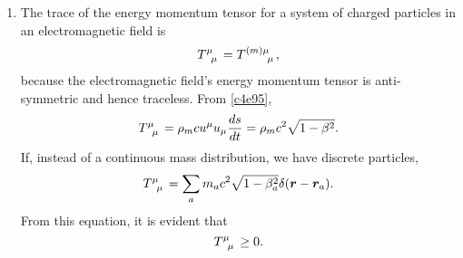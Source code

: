\begin{enumerate}
\item The trace of the energy momentum tensor for a system of charged particles
in an electromagnetic field is
\begin{equation}\label{c4e106}
\tensor{T}{^\mu_\mu} = \tensor{T}{^{(m)\mu}_\mu},
\end{equation}
because the electromagnetic field's energy momentum tensor is anti-symmetric and
hence traceless. From \eqref{c4e95},
\begin{equation}\label{c4e107}
\tensor{T}{^\mu_\mu} = \rho_m cu^\mu u_\mu \td{s}{t} = \rho_m c^2\sqrt{1 - \beta^2}.
\end{equation}
If, instead of a continuous mass distribution, we have discrete particles,
\begin{equation}\label{c4e108}
\tensor{T}{^{\mu}_\mu} = \sum_a m_ac^2\sqrt{1 - \beta_a^2}\delta(\vec{r} - \vec{r}_a).
\end{equation}
From this equation, it is evident that
\begin{equation}\label{c4e109}
\tensor{T}{^\mu_\mu} \ge 0.
\end{equation}


\end{enumerate}
